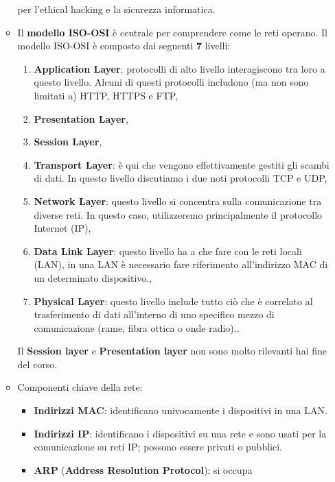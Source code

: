 \documentclass[12pt]{article}
\begin{document}
\begin{enumerate}
\begin{itemize}
        per l'ethical hacking e la sicurezza informatica.
        \item Il \textbf{modello ISO-OSI} \`{e} centrale per comprendere come 
        le reti operano. Il modello ISO-OSI \`{e} composto dai seguenti \textbf{7} 
        livelli:
        \begin{enumerate}
            \item \textbf{Application Layer}: protocolli di alto livello 
            interagiscono tra loro a questo livello. Alcuni di questi protocolli 
            includono (ma non sono limitati a) HTTP, HTTPS e FTP,
            \item \textbf{Presentation Layer},
            \item \textbf{Session Layer},
            \item \textbf{Transport Layer}: \`{e} qui che vengono effettivamente 
            gestiti gli scambi di dati. In questo livello discutiamo i due noti 
            protocolli TCP e UDP,
            \item \textbf{Network Layer}: questo livello si concentra sulla 
            comunicazione tra diverse reti. In questo caso, utilizzeremo 
            principalmente il protocollo Internet (IP),
            \item \textbf{Data Link Layer}: questo livello ha a che fare con le 
            reti locali (LAN), in una LAN \`{e} necessario fare riferimento 
            all'indirizzo MAC di un determinato dispositivo.,
            \item \textbf{Physical Layer}: questo livello include tutto ci\`{o} che 
            \`{e} correlato al trasferimento di dati all'interno di uno specifico 
            mezzo di comunicazione (rame, fibra ottica o onde radio)..
        \end{enumerate} 
        Il \textbf{Session layer} e \textbf{Presentation layer} non sono molto 
        rilevanti hai fine del corso.
        \item Componenti chiave della rete:
        \begin{itemize}
            \item \textbf{Indirizzi MAC}: identificano univocamente i dispositivi 
            in una LAN.
            \item \textbf{Indirizzi IP}: identificano i dispositivi su una rete 
            e sono usati per la comunicazione su reti IP; possono essere privati 
            o pubblici.
            \item \textbf{ARP} (\textbf{Address Resolution Protocol}): si occupa 

\end{itemize}
\end{itemize}
\end{enumerate}
\end{document}
